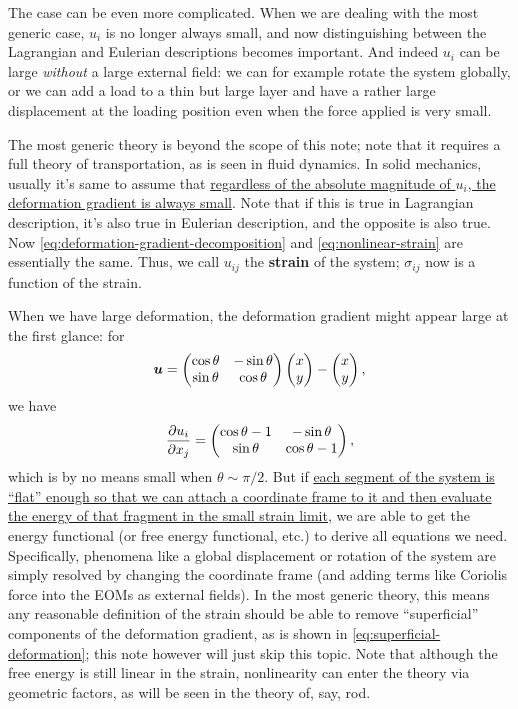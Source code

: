 \documentclass[hyperref, a4paper]{article}
\newcommand*{\concept}[1]{{\textbf{#1}}}
\begin{document}
The case can be even more complicated. 
When we are dealing with the most generic case, 
$u_{i}$ is no longer always small, 
and now distinguishing between the Lagrangian and Eulerian descriptions 
becomes important.
And indeed $u_{i}$ can be large \emph{without} a large external field: 
we can for example rotate the system globally, 
or we can add a load to a thin but large layer 
and have a rather large displacement at the loading position
even when the force applied is very small.

The most generic theory is beyond the scope of this note; 
note that it requires a full theory of transportation, 
as is seen in fluid dynamics.
In solid mechanics,
usually it's same to assume that 
\ul{regardless of the absolute magnitude of $u_i$, 
the deformation gradient is always small}.
Note that if this is true in Lagrangian description,
it's also true in Eulerian description,
and the opposite is also true.
Now \eqref{eq:deformation-gradient-decomposition} and 
\eqref{eq:nonlinear-strain} are essentially the same.
Thus, we call $u_{ij}$ the \concept{strain} of the system; 
$\sigma_{ij}$ now is a function of the strain.

When we have large deformation,
the deformation gradient might appear large at the first glance: 
for 
\begin{equation}
    \vb*{u} = \pmqty{
        \cos \theta & - \sin \theta \\
        \sin \theta & \cos \theta
    } \pmqty{x \\ y} - \pmqty{x \\ y},
\end{equation} 
we have 
\begin{equation}
    \pdv{u_i}{x_j} = \pmqty{
        \cos \theta - 1 & - \sin \theta \\ 
        \sin \theta & \cos \theta - 1
    },
    \label{eq:superficial-deformation}
\end{equation}
which is by no means small when $\theta \sim \pi / 2$.
But if \ul{each segment of the system is ``flat'' enough so that 
we can attach a coordinate frame to it 
and then evaluate the energy of that fragment 
in the small strain limit}, 
we are able to get the energy functional (or free energy functional, etc.) 
to derive all equations we need. 
Specifically, phenomena like a global displacement or rotation of the system 
are simply resolved by changing the coordinate frame 
(and adding terms like Coriolis force into the EOMs as external fields).
In the most generic theory, 
this means any reasonable definition of the strain 
should be able to remove ``superficial'' components of the deformation gradient,
as is shown in \eqref{eq:superficial-deformation}; 
this note however will just skip this topic. 
Note that although the free energy is still linear in the strain, 
nonlinearity can enter the theory via geometric factors, 
as will be seen in the theory of, say, rod.
\end{document}

